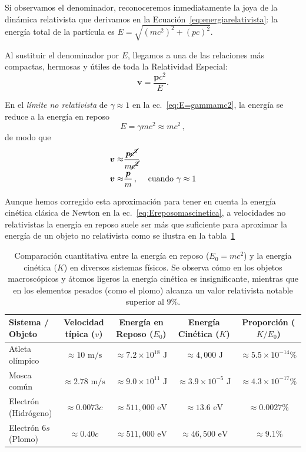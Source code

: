 \documentclass[11pt,a4paper]{book}
\renewcommand{\arraystretch}{1.9}
\begin{document}
Si observamos el denominador, reconoceremos inmediatamente la joya de la dinámica relativista que derivamos en la Ecuación~\eqref{eq:energiarelativista}: la energía total de la partícula es $E = \sqrt{(mc^2)^2 + (pc)^2}$. 

Al sustituir el denominador por $E$, llegamos a una de las relaciones más compactas, hermosas y útiles de toda la Relatividad Especial:
\begin{equation}
    \boldsymbol{v} = \frac{\boldsymbol{p} c^2}{E}.
\end{equation}

En el \emph{límite no relativista} de $\gamma \approx 1$ en la ec.~\eqref{eq:E=gammamc2}, la energía se reduce a la energía en reposo
\begin{equation}
    E=\gamma m c^2\approx mc^2\,,
\end{equation}
de modo que 
\begin{align}
\label{eq:nonrelativistcvelocity}
    \boldsymbol{v} \approx & \frac{\boldsymbol{p}\cancel{c^2}}{m\cancel{c^2}}&&\nonumber\\
    \boldsymbol{v} \approx & \frac{\boldsymbol{p}}{m}\,,&&\text{cuando $\gamma\approx 1$}
\end{align}

Aunque hemos corregido esta aproximación para tener en cuenta la energía cinética clásica de Newton en la ec.~\eqref{eq:Ereposomascinetica}, a velocidades no relativistas la energía en reposo suele ser más que suficiente para aproximar la energía de un objeto no relativista como se ilustra en la tabla~\ref{tab:comparacion_relativista}

\begin{table}[htbp]
\centering
\renewcommand{\arraystretch}{1.4}
\begin{tabular}{|l|c|c|c|c|}
\hline
\textbf{Sistema / Objeto} & \textbf{Velocidad típica ($v$)} & \textbf{Energía en Reposo ($E_0$)} & \textbf{Energía Cinética ($K$)} & \textbf{Proporción ($K / E_0$)} \\ \hline
Atleta olímpico & $\approx 10 \text{ m/s}$ & $\approx 7.2 \times 10^{18} \text{ J}$ & $\approx 4,000 \text{ J}$ & $\approx 5.5 \times 10^{-14}\%$ \\ \hline
Mosca común & $\approx 2.78 \text{ m/s}$ & $\approx 9.0 \times 10^{11} \text{ J}$ & $\approx 3.9 \times 10^{-5} \text{ J}$ & $\approx 4.3 \times 10^{-17}\%$ \\ \hline
Electrón (Hidrógeno) & $\approx 0.0073c$ & $\approx 511,000 \text{ eV}$ & $\approx 13.6 \text{ eV}$ & $\approx 0.0027\%$ \\ \hline
Electrón $6s$ (Plomo) & $\approx 0.40c$ & $\approx 511,000 \text{ eV}$ & $\approx 46,500 \text{ eV}$ & $\approx 9.1\%$ \\ \hline
\end{tabular}
\caption{Comparación cuantitativa entre la energía en reposo ($E_0 = mc^2$) y la energía cinética ($K$) en diversos sistemas físicos. Se observa cómo en los objetos macroscópicos y átomos ligeros la energía cinética es insignificante, mientras que en los elementos pesados (como el plomo) alcanza un valor relativista notable superior al $9\%$.}
\label{tab:comparacion_relativista}
\end{table}
\end{document}
